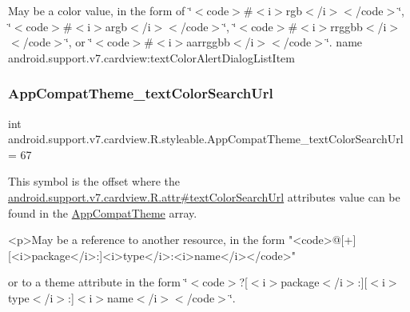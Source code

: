 May be a color value, in the form of \char`\"{}$<$code$>$\#$<$i$>$rgb$<$/i$>$$<$/code$>$\char`\"{}, \char`\"{}$<$code$>$\#$<$i$>$argb$<$/i$>$$<$/code$>$\char`\"{}, \char`\"{}$<$code$>$\#$<$i$>$rrggbb$<$/i$>$$<$/code$>$\char`\"{}, or \char`\"{}$<$code$>$\#$<$i$>$aarrggbb$<$/i$>$$<$/code$>$\char`\"{}.  name android.\+support.\+v7.\+cardview\+:text\+Color\+Alert\+Dialog\+List\+Item \mbox{\label{classandroid_1_1support_1_1v7_1_1cardview_1_1R_1_1styleable_af07efe85225b786325d19d1acd12a0a9}} 
\subsubsection{\texorpdfstring{App\+Compat\+Theme\+\_\+text\+Color\+Search\+Url}{AppCompatTheme\_textColorSearchUrl}}
{\footnotesize\ttfamily int android.\+support.\+v7.\+cardview.\+R.\+styleable.\+App\+Compat\+Theme\+\_\+text\+Color\+Search\+Url = 67\hspace{0.3cm}{\ttfamily [static]}}

This symbol is the offset where the \hyperlink{classandroid_1_1support_1_1v7_1_1cardview_1_1R_1_1attr_a86da2cd11159845c8daaa8dbdda4e306}{android.\+support.\+v7.\+cardview.\+R.\+attr\#text\+Color\+Search\+Url} attribute\textquotesingle{}s value can be found in the \hyperlink{classandroid_1_1support_1_1v7_1_1cardview_1_1R_1_1styleable_a52e6f69f954ecc2622d72c0b4d298938}{App\+Compat\+Theme} array.

\begin{DoxyVerb}      <p>May be a reference to another resource, in the form "<code>@[+][<i>package</i>:]<i>type</i>:<i>name</i></code>"
\end{DoxyVerb}
 or to a theme attribute in the form \char`\"{}$<$code$>$?\mbox{[}$<$i$>$package$<$/i$>$\+:\mbox{]}\mbox{[}$<$i$>$type$<$/i$>$\+:\mbox{]}$<$i$>$name$<$/i$>$$<$/code$>$\char`\"{}. 

